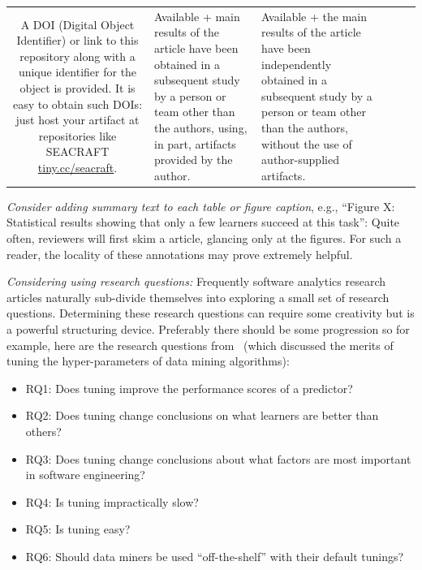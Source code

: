 \documentclass[10pt]{elsarticle}
\newcommand{\bi}{\begin{itemize}}
\newcommand{\ei}{\end{itemize}}
\begin{document}
\begin{table}[!t]
\begin{tabular}{c|P{0.6in}|P{0.8in}|P{0.9in}|P{0.6in}|P{0.6in}}
A DOI (Digital Object Identifier) or link to this repository along with a unique identifier for the object is provided. It is easy to obtain such DOIs: just host your artifact at repositories like SEACRAFT
\href{https://tiny.cc/seacraft}{tiny.cc/seacraft}. &
Available + main results of the article have been obtained in a subsequent study by a person or team other than the authors, using, in part, artifacts provided by the author.  &
Available + the main results of the article have been independently obtained in a subsequent study by a person or team other than the authors, without the use of author-supplied artifacts. \\ 
\end{tabular}
\end{table}

{\em Consider adding summary text to each table or figure caption}, e.g., ``Figure X: Statistical results showing that only a few learners succeed at this task'':  Quite often, reviewers will first skim  a article, glancing only at the figures. For such a reader, the locality of these annotations may prove extremely helpful.  

{\em Considering using research questions:} Frequently software analytics research articles naturally sub-divide themselves into exploring a small set of research questions. Determining these research questions can require some creativity but is a powerful structuring device. Preferably there should be some progression so for example, here are the research questions from~\cite{fu2016} (which discussed the merits of tuning the hyper-parameters of data mining algorithms):

\bi
\item RQ1: Does tuning improve the performance scores of a predictor? 
\item RQ2: Does tuning change conclusions on what learners are better than others? 
\item RQ3: Does tuning change conclusions about what factors are most important in software engineering? 
\item RQ4: Is tuning impractically slow? 
\item RQ5:
Is tuning easy?
\item RQ6: Should data miners be used ``off-the-shelf'' with their default tunings? 
\ei

\end{document}
